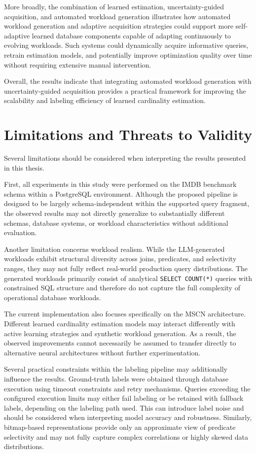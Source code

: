 More broadly, the combination of learned estimation, uncertainty-guided acquisition, and automated workload generation illustrates how automated workload generation and adaptive acquisition strategies could support more self-adaptive learned database components capable of adapting continuously to evolving workloads. Such systems could dynamically acquire informative queries, retrain estimation models, and potentially improve optimization quality over time without requiring extensive manual intervention.

Overall, the results indicate that integrating automated workload generation with uncertainty-guided acquisition provides a practical framework for improving the scalability and labeling efficiency of learned cardinality estimation.

\section{Limitations and Threats to Validity}

Several limitations should be considered when interpreting the results presented in this thesis.

First, all experiments in this study were performed on the IMDB benchmark schema within a PostgreSQL environment. Although the proposed pipeline is designed to be largely schema-independent within the supported query fragment, the observed results may not directly generalize to substantially different schemas, database systems, or workload characteristics without additional evaluation.

Another limitation concerns workload realism. While the LLM-generated workloads exhibit structural diversity across joins, predicates, and selectivity ranges, they may not fully reflect real-world production query distributions. The generated workloads primarily consist of analytical \texttt{SELECT COUNT(*)} queries with constrained SQL structure and therefore do not capture the full complexity of operational database workloads.

The current implementation also focuses specifically on the MSCN architecture. Different learned cardinality estimation models may interact differently with active learning strategies and synthetic workload generation. As a result, the observed improvements cannot necessarily be assumed to transfer directly to alternative neural architectures without further experimentation.

Several practical constraints within the labeling pipeline may additionally influence the results. Ground-truth labels were obtained through database execution using timeout constraints and retry mechanisms. Queries exceeding the configured execution limits may either fail labeling or be retained with fallback labels, depending on the labeling path used. This can introduce label noise and should be considered when interpreting model accuracy and robustness. Similarly, bitmap-based representations provide only an approximate view of predicate selectivity and may not fully capture complex correlations or highly skewed data distributions.


